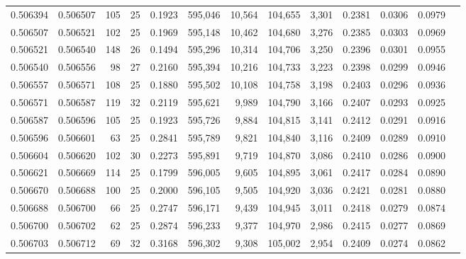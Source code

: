 \begin{tabular}{rrrrrrrrrrrrr}
0.506394 & 0.506507 & 105 &  25 &                                     0.1923 & 595,046 &  10,564 & 104,655 &   3,301 & 0.2381 & 0.0306 & 0.0979 \\
0.506507 & 0.506521 & 102 &  25 &                                     0.1969 & 595,148 &  10,462 & 104,680 &   3,276 & 0.2385 & 0.0303 & 0.0969 \\
0.506521 & 0.506540 & 148 &  26 &                                     0.1494 & 595,296 &  10,314 & 104,706 &   3,250 & 0.2396 & 0.0301 & 0.0955 \\
0.506540 & 0.506556 &  98 &  27 &                                     0.2160 & 595,394 &  10,216 & 104,733 &   3,223 & 0.2398 & 0.0299 & 0.0946 \\
0.506557 & 0.506571 & 108 &  25 &                                     0.1880 & 595,502 &  10,108 & 104,758 &   3,198 & 0.2403 & 0.0296 & 0.0936 \\
0.506571 & 0.506587 & 119 &  32 &                                     0.2119 & 595,621 &   9,989 & 104,790 &   3,166 & 0.2407 & 0.0293 & 0.0925 \\
0.506587 & 0.506596 & 105 &  25 &                                     0.1923 & 595,726 &   9,884 & 104,815 &   3,141 & 0.2412 & 0.0291 & 0.0916 \\
0.506596 & 0.506601 &  63 &  25 &                                     0.2841 & 595,789 &   9,821 & 104,840 &   3,116 & 0.2409 & 0.0289 & 0.0910 \\
0.506604 & 0.506620 & 102 &  30 &                                     0.2273 & 595,891 &   9,719 & 104,870 &   3,086 & 0.2410 & 0.0286 & 0.0900 \\
0.506621 & 0.506669 & 114 &  25 &                                     0.1799 & 596,005 &   9,605 & 104,895 &   3,061 & 0.2417 & 0.0284 & 0.0890 \\
0.506670 & 0.506688 & 100 &  25 &                                     0.2000 & 596,105 &   9,505 & 104,920 &   3,036 & 0.2421 & 0.0281 & 0.0880 \\
0.506688 & 0.506700 &  66 &  25 &                                     0.2747 & 596,171 &   9,439 & 104,945 &   3,011 & 0.2418 & 0.0279 & 0.0874 \\
0.506700 & 0.506702 &  62 &  25 &                                     0.2874 & 596,233 &   9,377 & 104,970 &   2,986 & 0.2415 & 0.0277 & 0.0869 \\
0.506703 & 0.506712 &  69 &  32 &                                     0.3168 & 596,302 &   9,308 & 105,002 &   2,954 & 0.2409 & 0.0274 & 0.0862 \\

\end{tabular}
